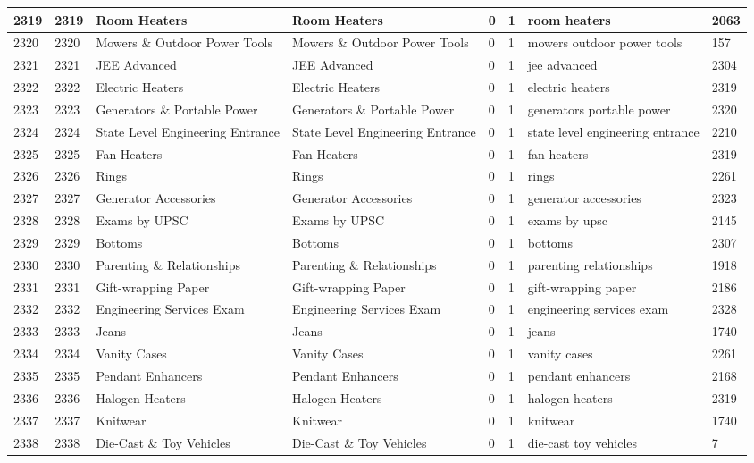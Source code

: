 \begin{longtable}{|l|l|l|l|l|l|l|l|}
2319 & 2319 & Room Heaters & Room Heaters & 0 & 1 & room heaters & 2063 \\ \hline 
2320 & 2320 & Mowers \& Outdoor Power Tools & Mowers \& Outdoor Power Tools & 0 & 1 & mowers outdoor power tools & 157 \\ \hline 
2321 & 2321 & JEE Advanced & JEE Advanced & 0 & 1 & jee advanced & 2304 \\ \hline 
2322 & 2322 & Electric Heaters & Electric Heaters & 0 & 1 & electric heaters & 2319 \\ \hline 
2323 & 2323 & Generators \& Portable Power & Generators \& Portable Power & 0 & 1 & generators portable power & 2320 \\ \hline 
2324 & 2324 & State Level Engineering Entrance & State Level Engineering Entrance & 0 & 1 & state level engineering entrance & 2210 \\ \hline 
2325 & 2325 & Fan Heaters & Fan Heaters & 0 & 1 & fan heaters & 2319 \\ \hline 
2326 & 2326 & Rings & Rings & 0 & 1 & rings & 2261 \\ \hline 
2327 & 2327 & Generator Accessories & Generator Accessories & 0 & 1 & generator accessories & 2323 \\ \hline 
2328 & 2328 & Exams by UPSC & Exams by UPSC & 0 & 1 & exams by upsc & 2145 \\ \hline 
2329 & 2329 & Bottoms & Bottoms & 0 & 1 & bottoms & 2307 \\ \hline 
2330 & 2330 & Parenting \& Relationships & Parenting \& Relationships & 0 & 1 & parenting relationships & 1918 \\ \hline 
2331 & 2331 & Gift-wrapping Paper & Gift-wrapping Paper & 0 & 1 & gift-wrapping paper & 2186 \\ \hline 
2332 & 2332 & Engineering Services Exam & Engineering Services Exam & 0 & 1 & engineering services exam & 2328 \\ \hline 
2333 & 2333 & Jeans & Jeans & 0 & 1 & jeans & 1740 \\ \hline 
2334 & 2334 & Vanity Cases & Vanity Cases & 0 & 1 & vanity cases & 2261 \\ \hline 
2335 & 2335 & Pendant Enhancers & Pendant Enhancers & 0 & 1 & pendant enhancers & 2168 \\ \hline 
2336 & 2336 & Halogen Heaters & Halogen Heaters & 0 & 1 & halogen heaters & 2319 \\ \hline 
2337 & 2337 & Knitwear & Knitwear & 0 & 1 & knitwear & 1740 \\ \hline 
2338 & 2338 & Die-Cast \& Toy Vehicles & Die-Cast \& Toy Vehicles & 0 & 1 & die-cast toy vehicles & 7 \\ \hline 

\end{longtable}
